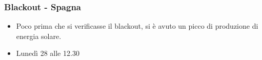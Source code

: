 \documentclass{beamer}
\begin{document}
\begin{frame}
    \frametitle{Blackout - Spagna}
    \begin{itemize}
        \item Poco prima che si verificasse il blackout, si è avuto un picco di produzione di energia solare.
	\item  Lunedì 28 alle 12.30
    \end{itemize}
    \vfill
    \begin{overlayarea}{\textwidth}{\textheight}
        \vfill
        \centering
    \end{overlayarea}
\end{frame}






\end{document}

